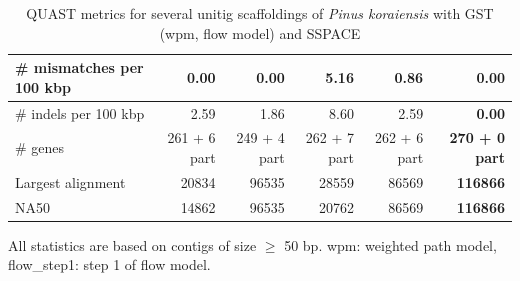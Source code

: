 \documentclass[12pt]{article}
\begin{document}
\begin{table}[h!]
\begin{center}
{\begin{tabular}{|l*{5}{|r}|}
\# mismatches per 100 kbp & {\bf 0.00} & {\bf 0.00} & 5.16 & 0.86 & {\bf 0.00} \\ \hline
\# indels per 100 kbp & 2.59 & 1.86 & 8.60 & 2.59 & {\bf 0.00} \\ \hline
\# genes & 261 + 6 part & 249 + 4 part & 262 + 7 part & 262 + 6 part & {\bf 270 + 0 part} \\ \hline
Largest alignment & 20834 & 96535 & 28559 & 86569 & {\bf 116866} \\ \hline
NA50 & 14862 & 96535 & 20762 & 86569 & {\bf 116866} \\ \hline
\end{tabular}
}
\end{center}
\caption{QUAST metrics for several unitig scaffoldings of \textit{Pinus koraiensis} with GST (wpm, flow model) and SSPACE}
\footnotesize{All statistics are based on contigs of size $\geq$ 50 bp. {\color{magenta}wpm}: weighted path model, {\color{magenta}flow\_step1}: step 1 of flow model.}
\label{tab:pinus}
\end{table}



\clearpage
\end{document}

